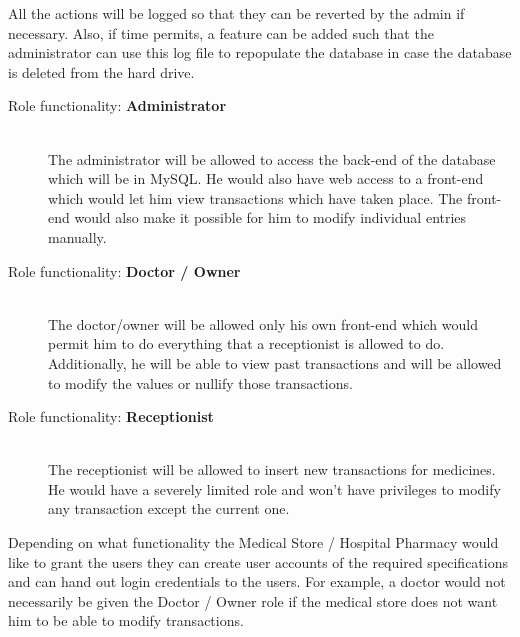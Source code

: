 \documentclass[a4papaer]{article}
\begin{document}
All the actions will be logged so that they can be reverted by the admin if necessary. Also, if time permits, a feature can be added such that the administrator can use this log file to repopulate the database in case the database is deleted from the hard drive.
\begin{description}
	\item[Role functionality: {\bf Administrator}]\hfill\\
		The administrator will be allowed to access the back-end of the database which will be in MySQL. He would also have web access to a front-end which would let him view transactions which have taken place. The front-end would also make it possible for him to modify individual entries manually.
	\item[Role functionality: {\bf Doctor / Owner}]\hfill\\
		The doctor/owner will be allowed only his own front-end which would permit him to do everything that a receptionist is allowed to do. Additionally, he will be able to view past transactions and will be allowed to modify the values or nullify those transactions.
	\item[Role functionality: {\bf Receptionist}]\hfill\\
		The receptionist will be allowed to insert new transactions for medicines. He would have a severely limited role and won't have privileges to modify any transaction except the current one.
\end{description}
Depending on what functionality the Medical Store / Hospital Pharmacy would like to grant the users they can create user accounts of the required specifications and can hand out login credentials to the users. For example, a doctor would not necessarily be given the Doctor / Owner role if the medical store does not want him to be able to modify transactions.
\thispagestyle{empty}
\end{document}

